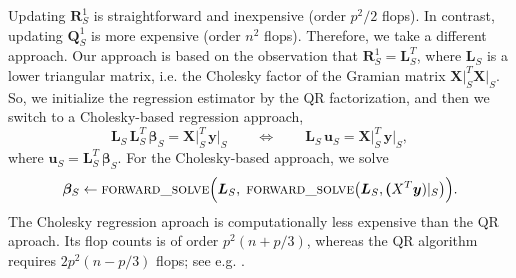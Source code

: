 \documentclass[a4paper,oneside,11pt,DIV=12]{scrartcl}
\begin{document}
Updating $\bm R_S^1$ is straightforward and inexpensive (order $p^2/2$ flops). In contrast, updating $\bm Q_S^1$ is more expensive (order $n^2$ flops). Therefore, we take a different approach. Our approach is based on the observation that $\bm R_S^1 = \bm L_S^T$, where $\bm L_S$ is a lower triangular matrix, i.e. the Cholesky factor of the Gramian matrix $\bm X\vert_S^T \bm X \vert_S$. So, we initialize the regression estimator by the QR factorization, and then we switch to a Cholesky-based regression approach,  
\begin{equation}
	\bm L_S \, \bm L_S^T \, \bm \beta_S = \bm X\vert_S^T \, \bm y\vert_S \qquad \Longleftrightarrow \qquad \bm L_S \, \bm u_S = \bm X\vert_S^T \, \bm y\vert_S, 
\end{equation}
\noindent where $\bm u_S = \bm L_S^T \, \bm \beta_S$. For the Cholesky-based approach, we solve 
\begin{equation}\label{eq:chol_reg}
	\bm \beta_S \gets \text{\textsc{forward\_solve}}\Big(\bm L_S, \; \text{\textsc{forward\_solve}}\big(\bm L_S, \bm (X^T \bm y)\vert_S\big)\Big).
\end{equation}
\noindent The Cholesky regression aproach is computationally less expensive than the QR aproach. Its flop counts is of order $p^2(n + p/3)$, whereas the QR algorithm requires $2p^2(n-p/3)$ flops; see e.g. \citet[][Chap. 5.3]{golub_loan_1996}.
\end{document}

